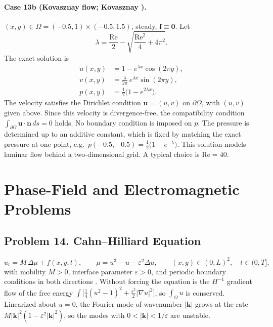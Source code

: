 \documentclass[11pt]{article}
\begin{document}
\paragraph{Case 13b (Kovasznay flow; Kovasznay \cite{Kov48}).}
$(x,y)\in\Omega=(-0.5,1)\times(-0.5,1.5)$, steady,
$\mathbf{f}\equiv\mathbf{0}$. Let
\[
\lambda=\frac{\mathrm{Re}}{2}-\sqrt{\frac{\mathrm{Re}^2}{4}+4\pi^2}.
\]
The exact solution is
\[
\begin{aligned}
u(x,y)&=1-e^{\lambda x}\cos(2\pi y),\\
v(x,y)&=\frac{\lambda}{2\pi}\,e^{\lambda x}\sin(2\pi y),\\
p(x,y)&=\frac12\bigl(1-e^{2\lambda x}\bigr).
\end{aligned}
\]
The velocity satisfies the Dirichlet condition $\mathbf{u}=(u,v)$ on
$\partial\Omega$, with $(u,v)$ given above. Since this velocity is
divergence-free, the compatibility condition
$\int_{\partial\Omega}\mathbf{u}\cdot\mathbf{n}\,ds=0$ holds. No boundary
condition is imposed on $p$. The pressure is determined up to an
additive constant, which is fixed by matching the exact pressure at one
point, e.g.\ $p(-0.5,-0.5)=\tfrac12\bigl(1-e^{-\lambda}\bigr)$. This
solution models laminar flow behind a two-dimensional grid. A typical
choice is $\mathrm{Re}=40$.

\section{Phase-Field and Electromagnetic Problems}

\subsection*{Problem 14. Cahn--Hilliard Equation}

\[
\boxed{u_t=M\,\Delta\mu+f(x,y,t),\qquad \mu=u^3-u-\varepsilon^2\Delta u},
\qquad (x,y)\in(0,L)^2,
\quad t\in(0,T],
\]
with mobility $M>0$, interface parameter $\varepsilon>0$, and periodic
boundary conditions in both directions \cite{CH58}. Without forcing the
equation is the $H^{-1}$ gradient flow of the free energy
$\int\bigl[\tfrac14(u^2-1)^2+\tfrac{\varepsilon^2}{2}|\nabla u|^2\bigr]$,
so $\int_\Omega u$ is conserved. Linearized about $u=0$, the Fourier mode
of wavenumber $|\mathbf{k}|$ grows at the rate
$M|\mathbf{k}|^2(1-\varepsilon^2|\mathbf{k}|^2)$, so the modes with
$0<|\mathbf{k}|<1/\varepsilon$ are unstable.
\end{document}

